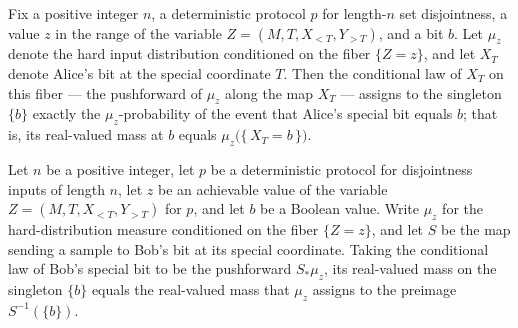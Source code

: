 \begin{theorem}
\label{CommunicationComplexity.Functions.Disjointness.RandomizedLowerBound.conditionalSpecialXLaw_singleton}
\leanok
{}
Fix a positive integer $n$, a deterministic protocol $p$ for length-$n$ set
disjointness, a value $z$ in the range of the variable $Z = (M, T, X_{<T}, Y_{>T})$, and
a bit $b$. Let $\mu_z$ denote the hard input distribution conditioned on the fiber $\{Z
= z\}$, and let $X_T$ denote Alice's bit at the special coordinate $T$. Then the
conditional law of $X_T$ on this fiber — the pushforward of $\mu_z$ along the map $X_T$
— assigns to the singleton $\{b\}$ exactly the $\mu_z$-probability of the event that
Alice's special bit equals $b$; that is, its real-valued mass at $b$ equals
$\mu_z\big(\{\,X_T = b\,\}\big)$.
\end{theorem}

\begin{theorem}
\label{CommunicationComplexity.Functions.Disjointness.RandomizedLowerBound.conditionalSpecialYLaw_singleton}
\leanok
{}
Let $n$ be a positive integer, let $p$ be a deterministic protocol for disjointness
inputs of length $n$, let $z$ be an achievable value of the variable
$Z=(M,T,X_{<T},Y_{>T})$ for $p$, and let $b$ be a Boolean value. Write $\mu_z$ for the
hard-distribution measure conditioned on the fiber $\{Z=z\}$, and let $S$ be the map
sending a sample to Bob's bit at its special coordinate. Taking the conditional law of
Bob's special bit to be the pushforward $S_*\mu_z$, its real-valued mass on the
singleton $\{b\}$ equals the real-valued mass that $\mu_z$ assigns to the preimage
$S^{-1}(\{b\})$.
\end{theorem}

